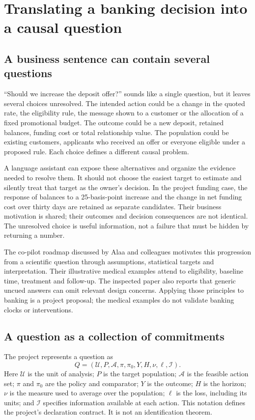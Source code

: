 \chapter{Translating a banking decision into a causal question}
\label{la:translation}

\section{A business sentence can contain several questions}

``Should we increase the deposit offer?'' sounds like a single question, but
it leaves several choices unresolved. The intended action could be a change
in the quoted rate, the eligibility rule, the message shown to a customer or
the allocation of a fixed promotional budget. The outcome could be a new
deposit, retained balances, funding cost or total relationship value. The
population could be existing customers, applicants who received an offer or
everyone eligible under a proposed rule. Each choice defines a different
causal problem.

A language assistant can expose these alternatives and organize the evidence
needed to resolve them. It should not choose the easiest target to estimate
and silently treat that target as the owner's decision. In the project funding
case, the response of balances to a 25-basis-point increase and the change in
net funding cost over thirty days are retained as separate candidates. Their
business motivation is shared; their outcomes and decision consequences are
not identical. The unresolved choice is useful information, not a failure
that must be hidden by returning a number.

The co-pilot roadmap discussed by Alaa and colleagues motivates this progression
from a scientific question through assumptions, statistical targets and
interpretation. Their illustrative medical examples attend to eligibility,
baseline time, treatment and follow-up. The inspected paper also reports that
generic uncued answers can omit relevant design concerns. Applying those
principles to banking is a project proposal; the medical examples do not
validate banking clocks or interventions.\cite{v12_la_2407_19118}

\section{A question as a collection of commitments}

The project represents a question as
\begin{equation}
 Q=(\mathcal U,P,\mathcal A,\pi,\pi_0,Y,H,\nu,\ell,\mathcal I).
 \label{la:question}
\end{equation}
Here \(\mathcal U\) is the unit of analysis; \(P\) is the target population;
\(\mathcal A\) is the feasible action set; \(\pi\) and \(\pi_0\) are the
policy and comparator; \(Y\) is the outcome; \(H\) is the horizon; \(\nu\)
is the measure used to average over the population; \(\ell\) is the loss,
including its units; and \(\mathcal I\) specifies information available at
each action. This notation defines the project's declaration contract. It is
not an identification theorem.

